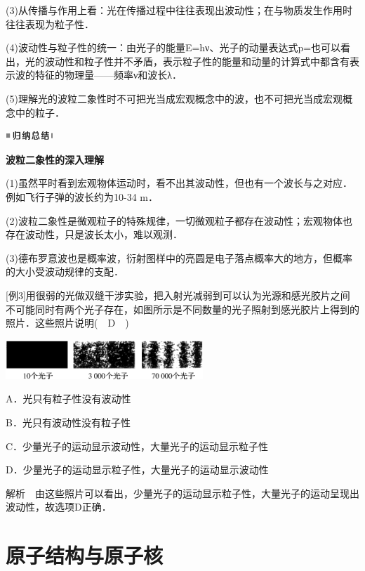 (3)从传播与作用上看：光在传播过程中往往表现出波动性；在与物质发生作用时往往表现为粒子性．

(4)波动性与粒子性的统一：由光子的能量E=hν、光子的动量表达式p=也可以看出，光的波动性和粒子性并不矛盾，表示粒子性的能量和动量的计算式中都含有表示波的特征的物理量------频率ν和波长λ．

(5)理解光的波粒二象性时不可把光当成宏观概念中的波，也不可把光当成宏观概念中的粒子．

\begin{center}\includegraphics[width=0.70764in,height=0.12292in]{media/image13.png}\end{center}
\begin{center}
  \textbf{波粒二象性的深入理解}
\end{center}

(1)虽然平时看到宏观物体运动时，看不出其波动性，但也有一个波长与之对应．例如飞行子弹的波长约为10-34
m．

(2)波粒二象性是微观粒子的特殊规律，一切微观粒子都存在波动性；宏观物体也存在波动性，只是波长太小，难以观测．

(3)德布罗意波也是概率波，衍射图样中的亮圆是电子落点概率大的地方，但概率的大小受波动规律的支配．

{[}例3{]}用很弱的光做双缝干涉实验，把入射光减弱到可以认为光源和感光胶片之间不可能同时有两个光子存在，如图所示是不同数量的光子照射到感光胶片上得到的照片．这些照片说明(　D　)

\begin{center}\includegraphics[width=2.93403in,height=0.58472in]{media/image474.png}\end{center}
A．光只有粒子性没有波动性

B．光只有波动性没有粒子性

C．少量光子的运动显示波动性，大量光子的运动显示粒子性

D．少量光子的运动显示粒子性，大量光子的运动显示波动性

解析　由这些照片可以看出，少量光子的运动显示粒子性，大量光子的运动呈现出波动性，故选项D正确．
\newpage
\section{原子结构与原子核}

